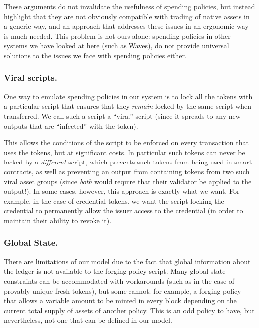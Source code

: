 These arguments do not invalidate the usefulness of spending policies, but instead highlight that
they are not obviously compatible with trading of native assets in a generic way, and an approach that addresses these issues in an ergonomic way is much needed.
This problem is not ours alone: spending policies in other systems we have looked at here (such as Waves),
do not provide universal solutions to the issues we face with spending policies either.

\subsubsection{Viral scripts.}

One way to emulate spending policies in our system is to lock all the tokens with a particular script that ensures
that they \emph{remain} locked by the same script when transferred.
We call such a script a ``viral'' script (since it spreads to any new outputs that are ``infected'' with the token).

This allows the conditions of the script to be enforced on every transaction that uses the tokens, but at significant costs.
In particular such tokens can never be locked by a \emph{different} script, which prevents such tokens from being used in smart contracts, as well as preventing an output from containing tokens from two such viral asset groups (since \emph{both} would require that their validator be applied to the output!).
In some cases, however, this approach is exactly what we want.
For example, in the case of credential tokens, we want
the script locking the credential to permanently allow the issuer access to the credential (in
order to maintain their ability to revoke it).

\subsubsection{Global State.}

There are limitations of our model due to the fact that global information about the ledger is not available to the forging policy script.
Many global state constraints can be accommodated with workarounds (such as in the case of provably unique fresh tokens), but some cannot:
for example, a forging policy that allows a variable amount to be minted in every block depending on the current total supply of assets of another policy.
This is an odd policy to have, but nevertheless, not one that can be defined in our model.


